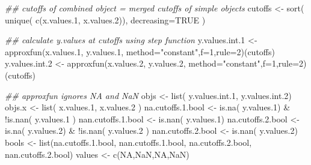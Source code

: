 \documentclass[
  letterpaper,
  DIV=11,
  numbers=noendperiod]{scrartcl}
\newenvironment{Shaded}{\begin{snugshade}}{\end{snugshade}}
\newcommand{\AttributeTok}[1]{\textcolor[rgb]{0.40,0.45,0.13}{#1}}
\newcommand{\ConstantTok}[1]{\textcolor[rgb]{0.56,0.35,0.01}{#1}}
\newcommand{\DecValTok}[1]{\textcolor[rgb]{0.68,0.00,0.00}{#1}}
\newcommand{\DocumentationTok}[1]{\textcolor[rgb]{0.37,0.37,0.37}{\textit{#1}}}
\newcommand{\FloatTok}[1]{\textcolor[rgb]{0.68,0.00,0.00}{#1}}
\newcommand{\FunctionTok}[1]{\textcolor[rgb]{0.28,0.35,0.67}{#1}}
\newcommand{\NormalTok}[1]{\textcolor[rgb]{0.00,0.23,0.31}{#1}}
\newcommand{\OtherTok}[1]{\textcolor[rgb]{0.00,0.23,0.31}{#1}}
\newcommand{\SpecialCharTok}[1]{\textcolor[rgb]{0.37,0.37,0.37}{#1}}
\newcommand{\StringTok}[1]{\textcolor[rgb]{0.13,0.47,0.30}{#1}}
\begin{document}
\begin{Shaded}
\begin{Highlighting}[]
        \DocumentationTok{\#\# cutoffs of combined object = merged cutoffs of simple objects}
\NormalTok{        cutoffs }\OtherTok{\textless{}{-}} \FunctionTok{sort}\NormalTok{( }\FunctionTok{unique}\NormalTok{( }\FunctionTok{c}\NormalTok{(x.values}\FloatTok{.1}\NormalTok{, x.values}\FloatTok{.2}\NormalTok{)), }\AttributeTok{decreasing=}\ConstantTok{TRUE}\NormalTok{ )}

        \DocumentationTok{\#\# calculate y.values at cutoffs using step function}
\NormalTok{        y.values.int}\FloatTok{.1} \OtherTok{\textless{}{-}} \FunctionTok{approxfun}\NormalTok{(x.values}\FloatTok{.1}\NormalTok{, y.values}\FloatTok{.1}\NormalTok{,}
                                    \AttributeTok{method=}\StringTok{"constant"}\NormalTok{,}\AttributeTok{f=}\DecValTok{1}\NormalTok{,}\AttributeTok{rule=}\DecValTok{2}\NormalTok{)(cutoffs)}
\NormalTok{        y.values.int}\FloatTok{.2} \OtherTok{\textless{}{-}} \FunctionTok{approxfun}\NormalTok{(x.values}\FloatTok{.2}\NormalTok{, y.values}\FloatTok{.2}\NormalTok{,}
                                    \AttributeTok{method=}\StringTok{"constant"}\NormalTok{,}\AttributeTok{f=}\DecValTok{1}\NormalTok{,}\AttributeTok{rule=}\DecValTok{2}\NormalTok{)(cutoffs)}

        \DocumentationTok{\#\# \textquotesingle{}approxfun\textquotesingle{} ignores NA and NaN}
\NormalTok{        objs }\OtherTok{\textless{}{-}} \FunctionTok{list}\NormalTok{( y.values.int}\FloatTok{.1}\NormalTok{, y.values.int}\FloatTok{.2}\NormalTok{)}
\NormalTok{        objs.x }\OtherTok{\textless{}{-}} \FunctionTok{list}\NormalTok{( x.values}\FloatTok{.1}\NormalTok{, x.values}\FloatTok{.2}\NormalTok{ )}
\NormalTok{        na.cutoffs.}\FloatTok{1.}\NormalTok{bool }\OtherTok{\textless{}{-}} \FunctionTok{is.na}\NormalTok{( y.values}\FloatTok{.1}\NormalTok{) }\SpecialCharTok{\&} \SpecialCharTok{!}\FunctionTok{is.nan}\NormalTok{( y.values}\FloatTok{.1}\NormalTok{ )}
\NormalTok{        nan.cutoffs.}\FloatTok{1.}\NormalTok{bool }\OtherTok{\textless{}{-}} \FunctionTok{is.nan}\NormalTok{( y.values}\FloatTok{.1}\NormalTok{)}
\NormalTok{        na.cutoffs.}\FloatTok{2.}\NormalTok{bool }\OtherTok{\textless{}{-}} \FunctionTok{is.na}\NormalTok{( y.values}\FloatTok{.2}\NormalTok{) }\SpecialCharTok{\&} \SpecialCharTok{!}\FunctionTok{is.nan}\NormalTok{( y.values}\FloatTok{.2}\NormalTok{ )}
\NormalTok{        nan.cutoffs.}\FloatTok{2.}\NormalTok{bool }\OtherTok{\textless{}{-}} \FunctionTok{is.nan}\NormalTok{( y.values}\FloatTok{.2}\NormalTok{)}
\NormalTok{        bools }\OtherTok{\textless{}{-}} \FunctionTok{list}\NormalTok{(na.cutoffs.}\FloatTok{1.}\NormalTok{bool, nan.cutoffs.}\FloatTok{1.}\NormalTok{bool,}
\NormalTok{                      na.cutoffs.}\FloatTok{2.}\NormalTok{bool, nan.cutoffs.}\FloatTok{2.}\NormalTok{bool)}
\NormalTok{        values }\OtherTok{\textless{}{-}} \FunctionTok{c}\NormalTok{(}\ConstantTok{NA}\NormalTok{,}\ConstantTok{NaN}\NormalTok{,}\ConstantTok{NA}\NormalTok{,}\ConstantTok{NaN}\NormalTok{)}
        

\end{Highlighting}
\end{Shaded}
\end{document}
